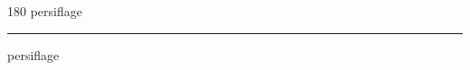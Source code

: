 
\begin{frame}
\begin{center}
\begin{turn}{180}
{\fontsize{2.5cm}{1em}\selectfont persiflage}
\end{turn}
\vspace{1em}\par  
\hrule
\vspace{1em}\par  
{\fontsize{2.5cm}{1em}\selectfont persiflage}
\end{center}
\end{frame}
